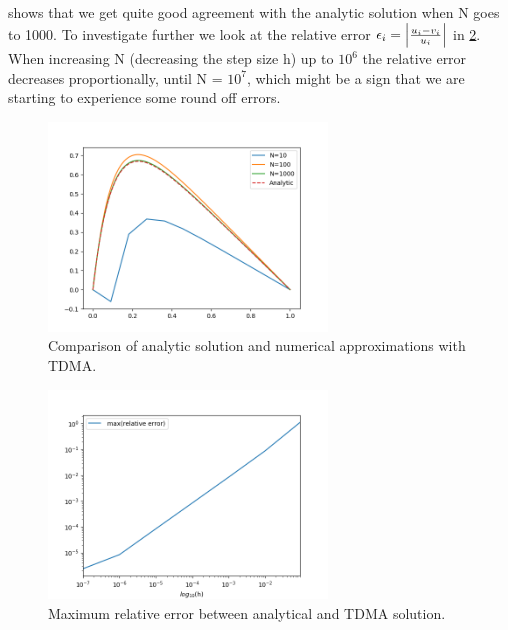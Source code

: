  shows that we get quite good agreement with the analytic solution
when N goes to 1000. To investigate further we look at the relative error
$\epsilon_i = \abs{\frac{u_i - v_i}{u_i}}$ in \cref{fig:relative_error}.
When increasing N (decreasing the step size h) up to $10^6$ the relative error
decreases proportionally, until N = $10^7$, which might be a sign that we are
starting to experience some round off errors.


\begin{figure}[htp]
  \centering
  \includegraphics[width=0.66\textwidth]{../figures/TDMA.png}
  \caption{Comparison of analytic solution and numerical approximations with TDMA.}
  \label{fig:a}
\end{figure}


\begin{figure}[htp]
  \centering
  \includegraphics[width=0.66\textwidth]{../figures/relative_error.png}
  \caption{Maximum relative error between analytical and TDMA solution.}
  \label{fig:relative_error}
\end{figure}
